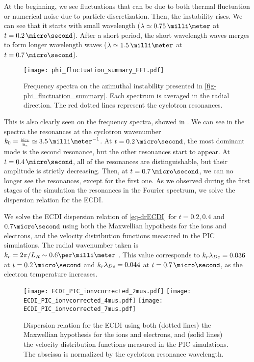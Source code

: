     At the beginning, we see fluctuations that can be due to both thermal fluctuation \citep{salpeter1960} or numerical noise due to particle discretization.
    Then, the instability rises.
    We can see that it starts with small wavelength ($\lambda \simeq 0.75\,\milli\meter$ at $t=0.2\,\micro\second$).
    After a short period, the short wavelength waves merges to form longer wavelength waves  ($\lambda \simeq 1.5\,\milli\meter$ at $t=0.7\,\micro\second$).
    
    
    \begin{figure}[!hbt]
      \centering
      \texttt{[image: phi\_fluctuation\_summary\_FFT.pdf]}
      \caption{Frequency spectra on the azimuthal instability presented in \cref{fig-phi_fluctuation_summary}. Each spectrum is averaged in the radial direction. The red dotted lines represent the cyclotron resonances.}
      \label{fig-phi_fluctuation_summary_FFT}
    \end{figure}
    
    This is also clearly seen on the frequency spectra, showed in .
    We can see in the spectra the resonances at the cyclotron wavenumber $k_0 = \frac{\oce}{u_e} \simeq 3.5\,\milli\meter^{-1}$.
    At $t=0.2\,\micro\second$, the most dominant mode is the second resonance, but the other resonances start to appear.
    At $t=0.4\,\micro\second$, all of the resonances are distinguishable, but their amplitude is strictly decreasing.
    Then, at $t=0.7\,\micro\second$, we can no longer see the resonances, except for the first one.
    As we observed during the first stages of the simulation the resonances in the Fourier spectrum, we solve the dispersion relation for the \ac{ECDI}.
    
    \vspace{1em}
    We solve the \ac{ECDI} dispersion relation of \cref{eq-drECDI} for $t=0.2, 0.4$ and $0.7\micro\second$ using both the Maxwellian hypothesis for the ions and electrons, and the velocity distribution functions measured in the \ac{PIC} simulations.
    The radial wavenumber taken is $k_r = 2 \pi/L_R \sim 0.6 \per\milli\meter$ \citep{lafleur2016,janhunen2018}.
    This value corresponds to $k_r \lambda_{De} = 0.036$ at $t=0.2\,\micro\second$ and $k_r \lambda_{De} = 0.044$ at $t=0.7\,\micro\second$, as the electron temperature increases.
    
    \begin{figure}[!hbt]
      \centering
        \texttt{[image: ECDI\_PIC\_ionvcorrected\_2mus.pdf]} 
        \texttt{[image: ECDI\_PIC\_ionvcorrected\_4mus.pdf]} 
        \texttt{[image: ECDI\_PIC\_ionvcorrected\_7mus.pdf]} 
      \caption{Dispersion relation for the \acs{ECDI} using both (dotted lines) the Maxwellian hypothesis for the ions and electrons, and (solid lines) the velocity distribution functions measured in the \acs{PIC} simulations. The abscissa is normalized by the cyclotron resonance wavelength.}
      \label{fig-DRECDI}
    \end{figure}
    
